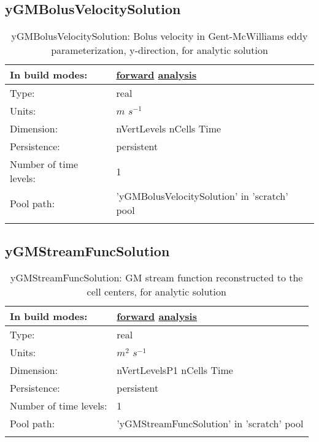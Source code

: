 \subsection[yGMBolusVelocitySolution]{yGMBolusVelocitySolution}
\label{subsec:var_sec_scratch_yGMBolusVelocitySolution}
\begin{center}
\begin{longtable}{| p{2.0in} | p{4.0in} |}
        \hline 
        In build modes: & \hyperref[subsec:forward_var_tab_scratch]{forward} \hyperref[subsec:analysis_var_tab_scratch]{analysis} \\
        \hline 
        Type: & real \\
        \hline 
        Units: & $m$ $s^{-1}$ \\
        \hline 
        Dimension: & nVertLevels nCells Time \\
        \hline 
        Persistence: & persistent \\
        \hline 
        Number of time levels: & 1 \\
        \hline 
            Pool path: & 'yGMBolusVelocitySolution' in 'scratch' pool
 \\
		 \hline 
    \caption{yGMBolusVelocitySolution: Bolus velocity in Gent-McWilliams eddy parameterization, y-direction, for analytic solution}
\end{longtable}
\end{center}
\subsection[yGMStreamFuncSolution]{yGMStreamFuncSolution}
\label{subsec:var_sec_scratch_yGMStreamFuncSolution}
\begin{center}
\begin{longtable}{| p{2.0in} | p{4.0in} |}
        \hline 
        In build modes: & \hyperref[subsec:forward_var_tab_scratch]{forward} \hyperref[subsec:analysis_var_tab_scratch]{analysis} \\
        \hline 
        Type: & real \\
        \hline 
        Units: & $m^2$ $s^{-1}$ \\
        \hline 
        Dimension: & nVertLevelsP1 nCells Time \\
        \hline 
        Persistence: & persistent \\
        \hline 
        Number of time levels: & 1 \\
        \hline 
            Pool path: & 'yGMStreamFuncSolution' in 'scratch' pool
 \\
		 \hline 
    \caption{yGMStreamFuncSolution: GM stream function reconstructed to the cell centers, for analytic solution}
\end{longtable}
\end{center}
